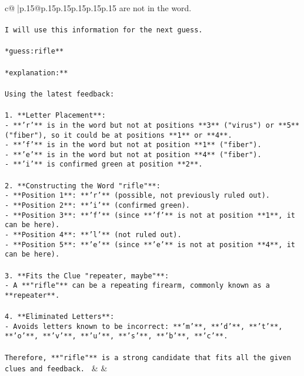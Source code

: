 \documentclass{article}
\begin{document}
{\begin{supertabular}{c@{$\;$}|p{.15\linewidth}@{}p{.15\linewidth}p{.15\linewidth}p{.15\linewidth}p{.15\linewidth}p{.15\linewidth}}
{{{are not in the word.\\ \tt \\ \tt I will use this information for the next guess.\\ \tt \\ \tt **guess:rifle**\\ \tt \\ \tt **explanation:**\\ \tt \\ \tt Using the latest feedback:\\ \tt \\ \tt 1. **Letter Placement**:\\ \tt    - **'r'** is in the word but not at positions **3** ("virus") or **5** ("fiber"), so it could be at positions **1** or **4**.\\ \tt    - **'f'** is in the word but not at position **1** ("fiber").\\ \tt    - **'e'** is in the word but not at position **4** ("fiber").\\ \tt    - **'i'** is confirmed green at position **2**.\\ \tt \\ \tt 2. **Constructing the Word "rifle"**:\\ \tt    - **Position 1**: **'r'** (possible, not previously ruled out).\\ \tt    - **Position 2**: **'i'** (confirmed green).\\ \tt    - **Position 3**: **'f'** (since **'f'** is not at position **1**, it can be here).\\ \tt    - **Position 4**: **'l'** (not ruled out).\\ \tt    - **Position 5**: **'e'** (since **'e'** is not at position **4**, it can be here).\\ \tt \\ \tt 3. **Fits the Clue "repeater, maybe"**:\\ \tt    - A **"rifle"** can be a repeating firearm, commonly known as a **repeater**.\\ \tt \\ \tt 4. **Eliminated Letters**:\\ \tt    - Avoids letters known to be incorrect: **'m'**, **'d'**, **'t'**, **'o'**, **'v'**, **'u'**, **'s'**, **'b'**, **'c'**.\\ \tt \\ \tt Therefore, **"rifle"** is a strong candidate that fits all the given clues and feedback. 
	  } 
	   } 
	   } 
	 & & \\ 
 


\end{supertabular}}
\end{document}
